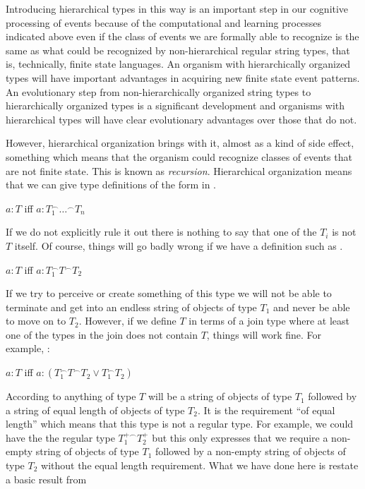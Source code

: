 Introducing hierarchical types in this way is an important step in our
cognitive processing of events because of the computational and
learning processes indicated above even if the class of events we are
formally able to recognize is the same as what could be recognized by
non-hierarchical regular string types, that is, technically, finite
state languages.  An organism with hierarchically organized types will
have important advantages in acquiring new finite state event
patterns.  An evolutionary step from non-hierarchically organized
string types to hierarchically organized types is a significant
development and organisms with hierarchical types will have clear
evolutionary advantages over those that do not.

However, hierarchical organization brings with it, almost as a kind of
side effect, something which means that the organism could recognize
classes of events that are not finite state.  This is known as
\textit{recursion}. Hierarchical organization means that we can give
type definitions of the form in \nexteg{}.
\begin{ex} 
$a:T$ iff $a:T_1^{\frown}\ldots^{\frown}T_n$ 
\end{ex} 
If we do not explicitly rule it out there is nothing to say that one
of the $T_i$ is not $T$ itself.  Of course, things will go badly wrong
if we have a definition such as \nexteg{}.
\begin{ex} 
$a:T$ iff $a:T_1^{\frown}T^{\frown}T_2$ 
\end{ex} 
If we try to perceive or create something of this type we will not be
able to terminate and get into an endless string of objects of type
$T_1$ and never be able to move on to $T_2$. However, if we define $T$
in terms of a join type where at least one of the types in the join
does not contain $T$, things will work fine.  For example, \nexteg{}:
\begin{ex} 
$a:T$ iff $a:(T_1^{\frown}T^{\frown}T_2\vee T_1^{\frown}T_2)$
\end{ex} 
According to \preveg{} anything of type $T$ will be a string of
objects of type $T_1$ followed by a string of equal length of objects
of type $T_2$.  It is the requirement ``of equal length'' which means
that this type is not a regular type.  For example, we could have the
the regular type $T_1^{+\frown}T_2^+$ but this only expresses that we
require a non-empty string of objects of type $T_1$ followed by a
non-empty string of objects of type $T_2$ without the equal length
requirement.   What we have done here is restate a basic result from
